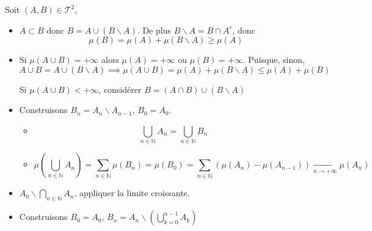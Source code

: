 \begin{myproof}{}{}
Soit $(A,B) \in \mathcal{T} ^{2}$, 
\begin{itemize}

    \item $A \subset B$ donc $B = A \cup (B \backslash A)$. De plus $B \backslash A = B \cap A ^{c}$, donc 
      \begin{equation}
        \mu(B) = \mu(A) + \mu(B \backslash A) \ge \mu(A)
      \end{equation}

    \item Si $\mu(A \cup B) = + \infty$ alors $\mu(A) = + \infty$ ou $\mu(B) = +\infty$. Puisque, sinon, 
      \begin{equation}
        A \cup B = A \cup (B \backslash A) \implies \mu (A \cup B) = \mu(A) + \mu(B \backslash A)\le \mu(A) + \mu(B)
      \end{equation}

      Si $\mu(A \cup B) < + \infty$, considérer $B = (A \cap B) \cup (B \backslash A)$

    \item Construisons $B_n = A _{n } \backslash A _{n -1}$, $B_0 = A_0$. 
      \begin{itemize}

          \item 
            \begin{equation}
              \bigcup _{n \in \mathbb{N}} A_n = \bigcup _{n \in \mathbb{N}} B_n
            \end{equation}

          \item 
            \begin{equation}
              \mu \left( \bigcup _{n \in \mathbb{N}} A_n \right) = \sum_{n\in \mathbb{N}}^{} \mu(B_n) = \mu(B_0) = \sum_{n \in \mathbb{N}}^{}  \left( \mu (A_n) - \mu (A _{n-1})\right)  \underset{n \to + \infty}{\longrightarrow}  \mu(A_n)
            \end{equation}


      \end{itemize}

    \item $A_0 \backslash \bigcap _{n \in \mathbb{N}} A_n$, appliquer la limite croissante.
    \item Construisons $B_0 = A_0$, $B _n = A_n \backslash \left( \bigcup _{k=0} ^{n-1} A_k \right)$
\end{itemize}

\end{myproof}

